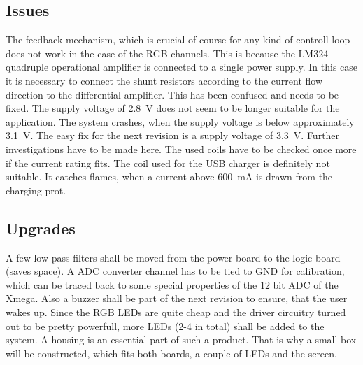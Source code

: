 \subsection{Issues}
\label{subsec:issues_hw}
The feedback mechanism, which is crucial of course for any kind of controll loop
does not work in the case of the RGB channels. This is because the LM324
quadruple operational amplifier is connected to a single power supply. In this
case it is necessary to connect the shunt resistors according to the current
flow direction to the differential amplifier. This has been confused and needs
to be fixed. 
\newpar
The supply voltage of \SI{2.8}{\volt} does not seem to be longer suitable for the
application. The system crashes, when the supply voltage is below approximately
\SI{3.1}{\volt}. The easy fix for the next revision is a supply voltage of
\SI{3.3}{V}. Further investigations have to be made here. 
\newpar
The used coils have to be checked once more if the current rating fits. The coil
used for the USB charger is definitely not suitable. It catches flames, when a current above \SI{600}{\milli\ampere} is drawn from the charging prot. 

\subsection{Upgrades}
\label{subsec:upgrades_hw}
A few low-pass filters shall be moved from the power board to the logic board
(saves space). 
\newpar
A ADC converter channel has to be tied to GND for calibration,
which can be traced back to some special properties of the 12 bit ADC of the
Xmega. 
\newpar
Also a buzzer shall be part of the next revision to ensure, that the user
wakes up.
\newpar
Since the RGB LEDs are quite cheap and the driver circuitry turned
out to be pretty powerfull, more LEDs (2-4 in total) shall be added to the system. 
\newpar
A housing is an essential part of such a product. That is why a small box will
be constructed, which fits both boards, a couple of LEDs and the screen. 

